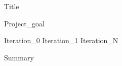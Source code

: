 \documentclass{article}
\begin{document}
{Title}


{Project_goal}

{Iteration_0}
{Iteration_1}
{Iteration_N}

\newpage
{Summary}


\nocite{Karolyn_Scott_latexTips}
\newpage
\printbibliography[heading = bibintoc, title = References]
\end{document}
